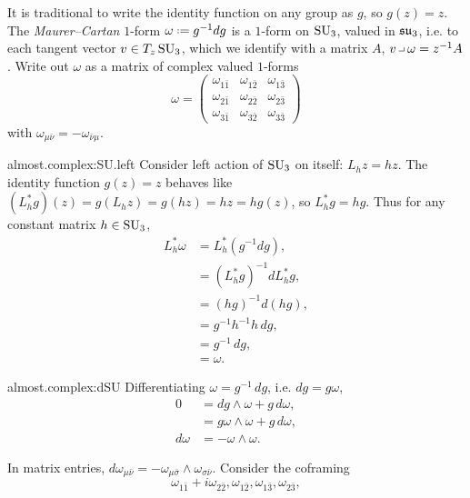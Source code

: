 \begin{example}
It is traditional to write the identity function on any group as \(g\), so \(g(z)=z\).
The \emph{Maurer--Cartan} \(1\)-form \(\omega\defeq g^{-1}dg\) is a \(1\)-form on \(\operatorname{SU}_{3}\), valued in \(\LieSU_3\), i.e. to each tangent vector \(v\in T_z \operatorname{SU}_{3}\), which we identify with a matrix \(A\), \(v\hook\omega=z^{-1}A\).
Write out \(\omega\) as a matrix of complex valued \(1\)-forms
\[
\omega
=
\begin{pmatrix}
\omega_{1\bar{1}}&\omega_{1\bar{2}}&\omega_{1\bar{3}}\\
\omega_{2\bar{1}}&\omega_{2\bar{2}}&\omega_{2\bar{3}}\\
\omega_{3\bar{1}}&\omega_{3\bar{2}}&\omega_{3\bar{3}}
\end{pmatrix}
\]
with \(\omega_{\mu\bar\nu}=-\omega_{\bar\nu\mu}\).
\begin{answer}{almost.complex:SU.left}
Consider left action of \(\operatorname{SU}_{3}\) on itself: \(L_h z=hz\).
The identity function \(g(z)=z\) behaves like \((L_h^*g)(z)=g(L_hz)=g(hz)=hz=hg(z)\), so \(L_h^*g=hg\).
Thus for any constant matrix \(h\in\operatorname{SU}_{3}\),
\begin{align*}
L_h^*\omega
&=L_h^*(g^{-1}dg),
\\
&=(L_h^*g)^{-1}dL_h^*g,
\\
&=
(hg)^{-1}d(hg),
\\
&=
g^{-1}h^{-1}h \, dg,
\\
&=
g^{-1}\,dg,
\\
&=\omega.
\end{align*}
\end{answer}
\begin{answer}{almost.complex:dSU}
Differentiating \(\omega=g^{-1}\,dg\), i.e. \(dg=g\omega\),
\begin{align*}
0&=
dg\wedge\omega+g\,d\omega,
\\
&=
g\omega\wedge\omega+g\,d\omega,\\
d\omega&=-\omega\wedge\omega.
\end{align*}
\end{answer}
In matrix entries,
\(d\omega_{\mu\bar\nu}=-\omega_{\mu\bar\sigma}\wedge\omega_{\sigma\bar\nu}\).
Consider the coframing 
\[
\omega_{1\bar{1}}+i\omega_{2\bar{2}},\omega_{1\bar{2}},\omega_{1\bar{3}},\omega_{2\bar{3}},
\]
\end{example}
